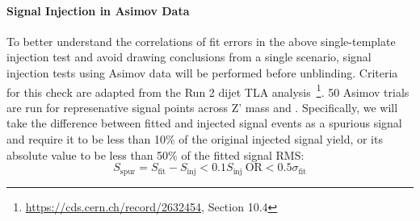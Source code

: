 \paragraph{Signal Injection in Asimov Data}
To better understand the correlations of fit errors in the above single-template injection test and avoid drawing conclusions from a single scenario, signal injection tests using Asimov data will be performed before unblinding. 
Criteria for this check are adapted from the Run 2 dijet TLA analysis~\footnote{\url{https://cds.cern.ch/record/2632454}, Section 10.4}.
50 Asimov trials are run for represenative signal points across Z' mass and \rinv.
Specifically, we will take the difference between fitted and injected signal events as a spurious signal and require it to be less than 10\% of the original injected signal yield, or its absolute value to be less than 50\% of the fitted signal RMS:
\begin{equation}
\label{eq:spursig}
S_{\text{spur}} = S_{\text{fit}} - S_{\text{inj}} < 0.1S_{\text{inj}} \ \text{OR} < 0.5\sigma_{\text{fit}}
\end{equation}


